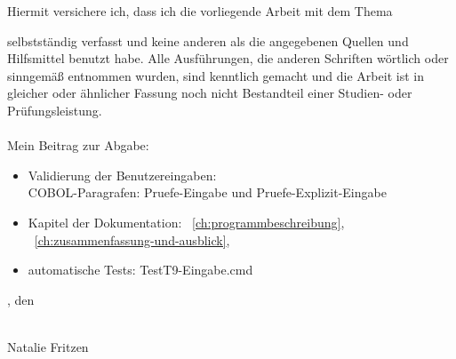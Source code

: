 Hiermit versichere ich, dass ich die vorliegende Arbeit mit dem Thema
\begin{quote}
    \textit{\titleDocument}
\end{quote}
selbstständig verfasst und keine anderen als die angegebenen Quellen und Hilfsmittel benutzt habe.
Alle Ausführungen, die anderen Schriften wörtlich oder sinngemäß entnommen wurden, sind kenntlich gemacht und die Arbeit ist in gleicher oder ähnlicher Fassung noch nicht Bestandteil einer Studien- oder Prüfungsleistung.
\\
\\
Mein Beitrag zur Abgabe:
\begin{itemize}[noitemsep]
    \item Validierung der Benutzereingaben:\\
    COBOL-Paragrafen: \glqq Pruefe-Eingabe\grqq{} und \glqq Pruefe-Explizit-Eingabe\grqq{}
    \item Kapitel der Dokumentation: ~\ref{ch:programmbeschreibung}, ~\ref{ch:zusammenfassung-und-ausblick},
    \item automatische Tests: TestT9-Eingabe.cmd
\end{itemize}
\vspace*{2cm}

\begingroup
\setlength{\parindent}{0pt} %

\locationDocument, den \dateDocument
\bigskip
\bigskip

\settowidth{\widthbox}{\locationDocument, den \dateDocument}

\makebox[\widthbox]{\hrulefill}\\
Natalie Fritzen
\endgroup
\newpage

